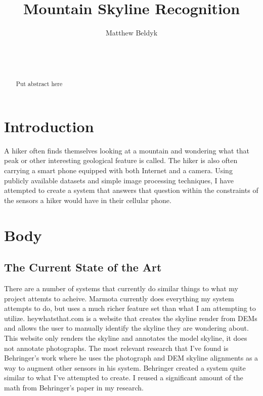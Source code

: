 \documentclass{acm_proc_article-sp}
\begin{document}
\title{Mountain Skyline Recognition}



%
\author{
\alignauthor
Matthew Beldyk\\
       \\
       \\
       \\
}

\maketitle
\begin{abstract}
Put abstract here
\end{abstract}

\section{Introduction}
A hiker often finds themselves looking at a mountain and wondering what that peak or other interesting geological feature is called.  The hiker is also often carrying a smart phone equipped with both Internet and a camera.  Using publicly available datasets and simple image processing techniques, I have attempted to create a system that answers that question within the constraints of the sensors a hiker would have in their cellular phone.  
\section{Body}
\subsection{The Current State of the Art}
There are a number of systems that currently do similar things to what my project attemts to acheive.  Marmota currently does everything my system attempts to do, but uses a much richer feature set than what I am attempting to utilize.  heywhatsthat.com is a website that creates the skyline render from DEMs and allows the user to manually identify the skyline they are wondering about.  This website only renders the skyline and annotates the model skyline, it does not annotate photographs.  The most relevant research that I’ve found is Behringer’s work where he uses the photograph and DEM skyline alignments as a way to augment other sensors in his system.  Behringer created a system quite similar to what I’ve attempted to create. I reused a significant amount of the math from Behringer’s paper in my research.
\end{document}
